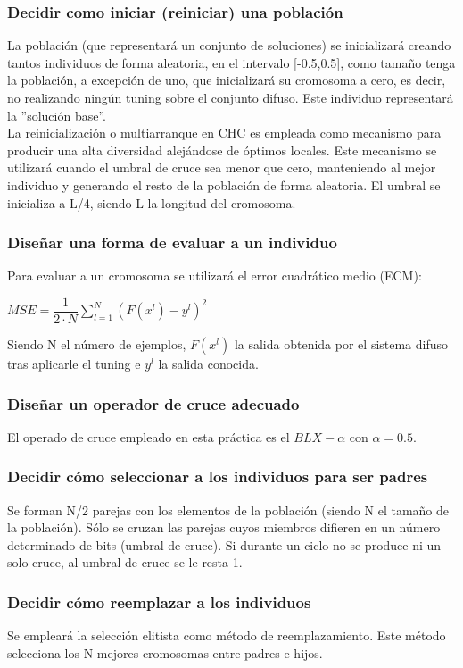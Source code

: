 \documentclass[12pt,a4paper]{article}
\begin{document}
\subsubsection{Decidir como iniciar (reiniciar) una población}
La población (que representará un conjunto de soluciones) se inicializará creando tantos individuos de forma aleatoria, en el intervalo [-0.5,0.5], como tamaño tenga la población, a excepción de uno, que inicializará su cromosoma a cero, es decir, no realizando ningún tuning sobre el conjunto difuso. Este individuo representará la ''solución base''.\\
La reinicialización o multiarranque en CHC es empleada como mecanismo para producir una alta diversidad alejándose de óptimos locales. Este mecanismo se utilizará cuando el umbral de cruce sea menor que cero, manteniendo al mejor individuo y generando el resto de la población de forma aleatoria. El umbral se inicializa a L/4, siendo L la longitud del cromosoma.

\subsubsection{Diseñar una forma de evaluar a un individuo}
Para evaluar a un cromosoma se utilizará el error cuadrático medio (ECM):
\begin{center}
$MSE = \dfrac{1}{2 \cdot N} \sum_{l=1}^{N}(F(x^{l}) - y^{l})^{2}$
\end{center}
Siendo N el número de ejemplos, $F(x^{l})$ la salida obtenida por el sistema difuso tras aplicarle el tuning e $y^{l}$ la salida conocida.

\subsubsection{Diseñar un operador de cruce adecuado}
El operado de cruce empleado en esta práctica es el $BLX-\alpha$ con $\alpha = 0.5$.

\subsubsection{Decidir cómo seleccionar a los individuos para ser padres}
Se forman N/2 parejas con los elementos de la población (siendo N el tamaño de la población). Sólo se cruzan las parejas cuyos miembros difieren en un número determinado de bits (umbral de cruce). Si durante un
ciclo no se produce ni un solo cruce, al umbral de cruce se le resta 1.

\subsubsection{Decidir cómo reemplazar a los individuos}
Se empleará la selección elitista como método de reemplazamiento. Este método selecciona los N mejores cromosomas entre padres e hijos.
\end{document}
